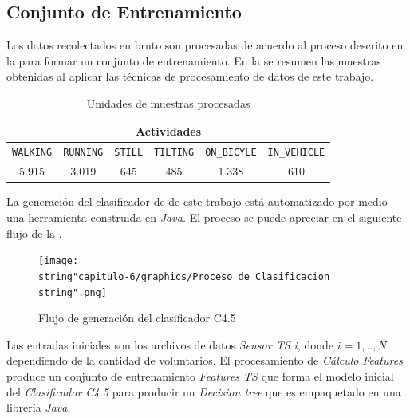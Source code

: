 \subsection{Conjunto de Entrenamiento }

Los datos recolectados en bruto son procesadas de acuerdo al proceso
descrito en la  para formar un conjunto
de entrenamiento. En la  se resumen las muestras
obtenidas al aplicar las técnicas de procesamiento de datos de este
trabajo. 

\begin{table}[h]
\begin{centering}
\begin{tabular}{|c|c|c|c|c|c|}
\hline 
\multicolumn{6}{|c|}{Actividades}\tabularnewline
\hline 
\texttt{\footnotesize{}WALKING} & \texttt{\footnotesize{}RUNNING} & \texttt{\footnotesize{}STILL} & \texttt{\footnotesize{}TILTING} & \texttt{\footnotesize{}ON\_BICYLE} & \texttt{\footnotesize{}IN\_VEHICLE}\tabularnewline
\hline 
\hline 
5.915 & 3.019 & 645 & 485 & 1.338 & 610\tabularnewline
\hline 
\end{tabular}
\par\end{centering}
\caption{\label{tab6:muestras}Unidades de muestras procesadas}
\end{table}

La generación del clasificador de  de este trabajo está
automatizado por medio una herramienta construida en \emph{Java. }El
proceso se puede apreciar en el siguiente flujo de la .

\begin{figure}[th]
\begin{centering}
\texttt{[image: \\string"capitulo-6/graphics/Proceso de Clasificacion\\string".png]}
\par\end{centering}
\caption{\label{fig6:proceso-clasi}Flujo de generación del clasificador C4.5}
\end{figure}

Las entradas iniciales son los archivos de datos \emph{Sensor TS i},
donde $i=1,..,N$ dependiendo de la cantidad de voluntarios. El procesamiento
de \emph{Cálculo Features} produce un conjunto de entrenamiento \emph{Features
TS }que forma el modelo inicial del \emph{Clasificador C4.5} para
producir un \emph{Decision tree} que es empaquetado en una librería
\emph{Java}.

